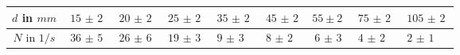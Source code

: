 \begin{tabular}{c|*{8}{*{1}{l}}}
$d$ in ${\si{mm}}$ & $\text{15 $\pm $ 2}$ & $\text{20 $\pm $ 2}$ & $\text{25 $\pm $ 2}$ & $\text{35 $\pm $ 2}$ & $\text{45 $\pm $ 2}$ & $55 \pm 2$ & $\text{75 $\pm $ 2}$ & $\text{105 $\pm $ 2}$ \\ \hline
$N$ in ${\si{1/s}}$ & $\text{36 $\pm $ 5}$ & $\text{26 $\pm $ 6}$ & $\text{19 $\pm $ 3}$ & $\text{9 $\pm $ 3}$ & $\text{8 $\pm $ 2}$ & $\text{6 $\pm $ 3}$ & $\text{4 $\pm $ 2}$ & $\text{2 $\pm $ 1}$\end{tabular}
